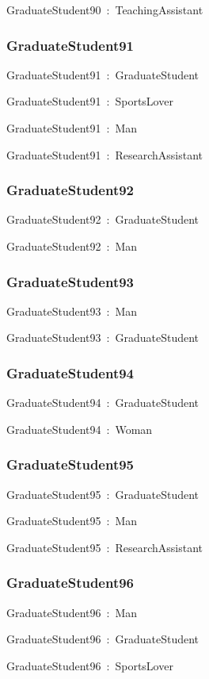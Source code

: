 \documentclass{article}
\begin{document}
GraduateStudent90~:~TeachingAssistant

\subsubsection*{GraduateStudent91}

GraduateStudent91~:~GraduateStudent

GraduateStudent91~:~SportsLover

GraduateStudent91~:~Man

GraduateStudent91~:~ResearchAssistant

\subsubsection*{GraduateStudent92}

GraduateStudent92~:~GraduateStudent

GraduateStudent92~:~Man

\subsubsection*{GraduateStudent93}

GraduateStudent93~:~Man

GraduateStudent93~:~GraduateStudent

\subsubsection*{GraduateStudent94}

GraduateStudent94~:~GraduateStudent

GraduateStudent94~:~Woman

\subsubsection*{GraduateStudent95}

GraduateStudent95~:~GraduateStudent

GraduateStudent95~:~Man

GraduateStudent95~:~ResearchAssistant

\subsubsection*{GraduateStudent96}

GraduateStudent96~:~Man

GraduateStudent96~:~GraduateStudent

GraduateStudent96~:~SportsLover
\end{document}
